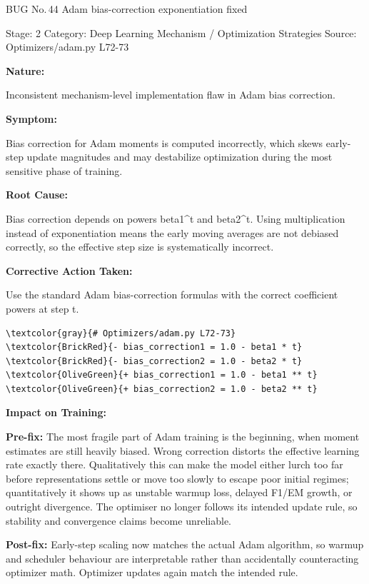 \documentclass[10pt]{article}
\newcommand{\FieldLabel}[1]{%
 {\bfseries #1:}\par
}
\begin{document}
\begin{bugbox}{BUG No.\,44 \quad Adam bias-correction exponentiation fixed}
{\color{MetaGray}\small Stage: 2 \;\textbar\; Category: Deep Learning Mechanism / Optimization Strategies \;\textbar\; Source: Optimizers/adam.py L72-73\par}
\vspace{0.22em}
\FieldLabel{Nature}
Inconsistent mechanism-level implementation flaw in Adam bias correction.
\par
\vspace{0.35em}
\FieldLabel{Symptom}
Bias correction for Adam moments is computed incorrectly, which skews early-step update magnitudes and may destabilize optimization during the most sensitive phase of training.
\par
\vspace{0.35em}
\FieldLabel{Root Cause}
Bias correction depends on powers beta1\^{}t and beta2\^{}t. Using multiplication instead of exponentiation means the early moving averages are not debiased correctly, so the effective step size is systematically incorrect.
\par
\vspace{0.35em}
\FieldLabel{Corrective Action Taken}
Use the standard Adam bias-correction formulas with the correct coefficient powers at step t.
\par
\vspace{0.35em}
\begin{Verbatim}[commandchars=\\\{\},fontsize=\footnotesize,breaklines=true,breaksymbol={},frame=leftline,framerule=2pt,rulecolor=\color{gray!40},xleftmargin=6pt,formatcom=\singlespacing]
\textcolor{gray}{# Optimizers/adam.py L72-73}
\textcolor{BrickRed}{- bias_correction1 = 1.0 - beta1 * t}
\textcolor{BrickRed}{- bias_correction2 = 1.0 - beta2 * t}
\textcolor{OliveGreen}{+ bias_correction1 = 1.0 - beta1 ** t}
\textcolor{OliveGreen}{+ bias_correction2 = 1.0 - beta2 ** t}
\end{Verbatim}
\vspace{0.22em}
\FieldLabel{Impact on Training}
\textbf{Pre-fix:} The most fragile part of Adam training is the beginning, when moment estimates are still heavily biased. Wrong correction distorts the effective learning rate exactly there. Qualitatively this can make the model either lurch too far before representations settle or move too slowly to escape poor initial regimes; quantitatively it shows up as unstable warmup loss, delayed F1/EM growth, or outright divergence. The optimiser no longer follows its intended update rule, so stability and convergence claims become unreliable. \par\smallskip
\textbf{Post-fix:} Early-step scaling now matches the actual Adam algorithm, so warmup and scheduler behaviour are interpretable rather than accidentally counteracting optimizer math. Optimizer updates again match the intended rule. 
\par
\vspace{0.35em}
\end{bugbox}
\end{document}

